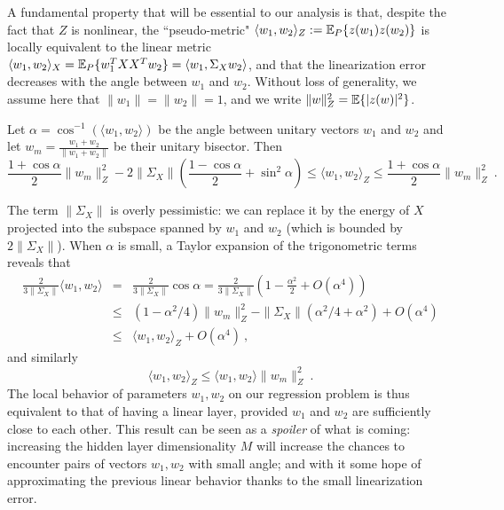  A fundamental property that will be essential to our analysis is that, despite 
the fact that $Z$ is nonlinear, the ``pseudo-metric" $\langle w_1, w_2 \rangle_Z := {\mathbb{E}}_P \{ z(w_1) z(w_2) \} $ 
is locally equivalent to the linear metric $\langle w_1, w_2 \rangle_X = {\mathbb{E}}_P \{ w_1^T X X^T w_2 \} = \langle w_1, \Sigma_X w_2 \rangle$, and that the linearization error decreases with the angle between $w_1$ and $w_2$. Without loss of generality, we assume here that $\|w_1 \| = \| w_2 \| = 1$, and we write $\| w \|_Z^2 = {\mathbb{E}} \{ | z(w) |^2 \} $.
\begin{proposition}
\label{localdistprop}
Let $\alpha = \cos^{-1}( \langle w_1, w_2 \rangle )$ be the angle between unitary vectors $w_1$ and $w_2$ and let $w_m =  \frac{w_1 + w_2}{\| w_1 + w_2 \|}$ be their unitary bisector. 
Then
\begin{equation}
\label{localdisteq}
 \frac{1 + \cos \alpha}{2}  \| w_m  \|_Z^2 - 2 \| \Sigma_X \| \left( \frac{1-\cos \alpha}{2} + \sin^2 \alpha \right) \leq \langle w_1, w_2 \rangle_Z \leq \frac{1+\cos \alpha}{2}  \| w_m  \|_Z^2 ~.
\end{equation}
\end{proposition} 
The term $\| \Sigma_X \| $ is overly pessimistic: we can replace it by the energy of $X$ projected into the subspace spanned by $w_1$ and $w_2$ (which is bounded by $2 \| \Sigma_X \|$). 
When $\alpha$ is small, a Taylor expansion of the trigonometric terms reveals that 
\begin{eqnarray*}
\frac{2}{3 \| \Sigma_X \|} \langle w_1, w_2 \rangle &=& \frac{2}{3 \| \Sigma_X \|} \cos \alpha = \frac{2}{3\| \Sigma_X \|}(1 - \frac{\alpha^2}{2} + O(\alpha^4)) \\ 
&\leq& ( 1 - \alpha^2/4)\| w_m \|_Z^2 - \| \Sigma_X \|( \alpha^2/4 + \alpha^2) + O(\alpha^4) \\
&\leq & \langle w_1, w_2 \rangle_Z + O(\alpha^4) ~,
\end{eqnarray*}
and similarly 
$$\langle w_1, w_2 \rangle_Z \leq \langle w_1, w_2 \rangle \| w_m \|_Z^2~.$$
The local behavior of parameters $w_1, w_2$ on our regression problem is thus equivalent to that of having a linear layer, provided $w_1$ and $w_2$ are sufficiently close to each other.
This result can be seen as a \emph{spoiler} of what is coming: increasing the hidden layer dimensionality $M$ will increase the chances to encounter pairs of vectors $w_1, w_2$ with small angle; and with it some hope of approximating the previous linear behavior thanks to the small linearization error. 

